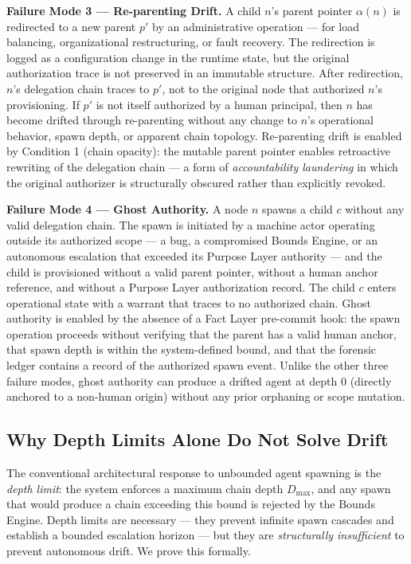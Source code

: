 \medskip
\noindent\textbf{Failure Mode 3 — Re-parenting Drift.}
A child $n$'s parent pointer $\alpha(n)$ is redirected to a new parent $p'$ by an administrative operation — for load balancing, organizational restructuring, or fault recovery. The redirection is logged as a configuration change in the runtime state, but the original authorization trace is not preserved in an immutable structure. After redirection, $n$'s delegation chain traces to $p'$, not to the original node that authorized $n$'s provisioning. If $p'$ is not itself authorized by a human principal, then $n$ has become drifted through re-parenting without any change to $n$'s operational behavior, spawn depth, or apparent chain topology. Re-parenting drift is enabled by Condition 1 (chain opacity): the mutable parent pointer enables retroactive rewriting of the delegation chain — a form of \emph{accountability laundering} in which the original authorizer is structurally obscured rather than explicitly revoked.

\medskip
\noindent\textbf{Failure Mode 4 — Ghost Authority.}
A node $n$ spawns a child $c$ without any valid delegation chain. The spawn is initiated by a machine actor operating outside its authorized scope — a bug, a compromised Bounds Engine, or an autonomous escalation that exceeded its Purpose Layer authority — and the child is provisioned without a valid parent pointer, without a human anchor reference, and without a Purpose Layer authorization record. The child $c$ enters operational state with a warrant that traces to no authorized chain. Ghost authority is enabled by the absence of a Fact Layer pre-commit hook: the spawn operation proceeds without verifying that the parent has a valid human anchor, that spawn depth is within the system-defined bound, and that the forensic ledger contains a record of the authorized spawn event. Unlike the other three failure modes, ghost authority can produce a drifted agent at depth $0$ (directly anchored to a non-human origin) without any prior orphaning or scope mutation.

\subsection{Why Depth Limits Alone Do Not Solve Drift}
\label{sec:drift-depth-limits}

The conventional architectural response to unbounded agent spawning is the \emph{depth limit}: the system enforces a maximum chain depth $D_{\max}$, and any spawn that would produce a chain exceeding this bound is rejected by the Bounds Engine. Depth limits are necessary — they prevent infinite spawn cascades and establish a bounded escalation horizon — but they are \emph{structurally insufficient} to prevent autonomous drift. We prove this formally.

